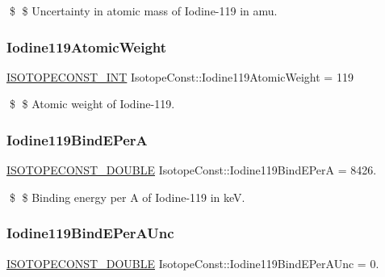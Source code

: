\$ \$ Uncertainty in atomic mass of Iodine-\/119 in amu. \mbox{\label{group___isotope_const-_iodine-_i119_ga55c57511aa2e76b245c85af007dee3b1}} 
\subsubsection{\texorpdfstring{Iodine119\+Atomic\+Weight}{Iodine119AtomicWeight}}
{\footnotesize\ttfamily \mbox{\hyperlink{group___isotope_const-_macros_ga5f18360b3e99483a35c32d789e62621c}{I\+S\+O\+T\+O\+P\+E\+C\+O\+N\+S\+T\+\_\+\+I\+NT}} Isotope\+Const\+::\+Iodine119\+Atomic\+Weight = 119}

\$ \$ Atomic weight of Iodine-\/119. \mbox{\label{group___isotope_const-_iodine-_i119_gaf992103b51ad4bfa8956b7acf2e84fe0}} 
\subsubsection{\texorpdfstring{Iodine119\+Bind\+E\+PerA}{Iodine119BindEPerA}}
{\footnotesize\ttfamily \mbox{\hyperlink{group___isotope_const-_macros_ga8f45a7272ce02c0b4c65c44636ed719a}{I\+S\+O\+T\+O\+P\+E\+C\+O\+N\+S\+T\+\_\+\+D\+O\+U\+B\+LE}} Isotope\+Const\+::\+Iodine119\+Bind\+E\+PerA = 8426.}

\$ \$ Binding energy per A of Iodine-\/119 in keV. \mbox{\label{group___isotope_const-_iodine-_i119_ga171204817d6f28129100206dc2e23f4d}} 
\subsubsection{\texorpdfstring{Iodine119\+Bind\+E\+Per\+A\+Unc}{Iodine119BindEPerAUnc}}
{\footnotesize\ttfamily \mbox{\hyperlink{group___isotope_const-_macros_ga8f45a7272ce02c0b4c65c44636ed719a}{I\+S\+O\+T\+O\+P\+E\+C\+O\+N\+S\+T\+\_\+\+D\+O\+U\+B\+LE}} Isotope\+Const\+::\+Iodine119\+Bind\+E\+Per\+A\+Unc = 0.}

